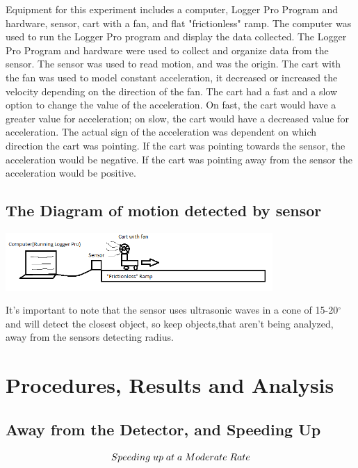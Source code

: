 \documentclass[aps,letterpaper,11pt]{revtex4}
\begin{document}
Equipment for this experiment includes a computer, Logger Pro Program and hardware, sensor, cart with a fan, and flat "frictionless" ramp. The computer was used to run the Logger Pro program and display the data collected. The Logger Pro Program and hardware were used to collect and organize data from the sensor. The sensor was used to read motion, and was the origin. The cart with the fan was used to model constant acceleration, it decreased or increased the velocity depending on the direction of the fan. The cart had a fast and a slow option to change the value of the acceleration. On fast, the cart would have a greater value for acceleration; on slow, the cart would have a decreased value for acceleration. The actual sign of the acceleration was dependent on which direction the cart was pointing. If the cart was pointing towards the sensor, the acceleration would be negative. If the cart was pointing away from the sensor the acceleration would be positive.  



\subsection{The Diagram of motion detected by sensor}

\begin{center}
\includegraphics[width=4in]{Setup.png}
\end{center}

It's important to note that the sensor uses ultrasonic waves in a cone of 15-20$^\circ$ and will detect the closest object, so keep objects,that aren't being analyzed, away from the sensors detecting radius.  


\section{Procedures, Results and Analysis}

\subsection{Away from the Detector, and Speeding Up}

$$Speeding \hspace{1mm}up \hspace{1mm} at \hspace{1mm} a \hspace{1mm} Moderate \hspace{1mm} Rate$$
\end{document}
